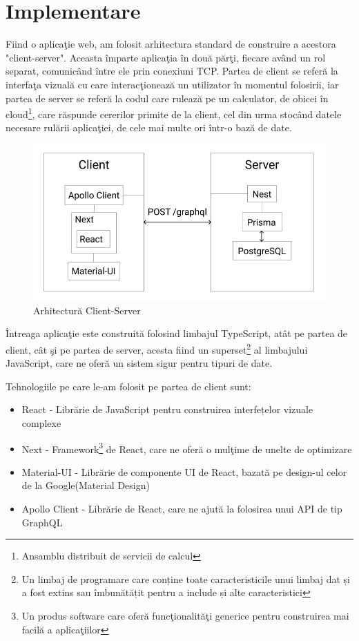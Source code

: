 \documentclass[12pt, a4paper, oneside, romanian]{teza-upb}
\begin{document}
\newpage
\hbox{}
\chapter{Implementare}

Fiind o aplicaţie web, am folosit arhitectura standard de construire a acestora "client-server". Aceasta împarte aplicaţia în două părţi, fiecare având un rol separat, comunicând între ele prin conexiuni TCP. Partea de client se referă la interfaţa vizuală cu care interacţionează un utilizator în momentul folosirii, iar partea de server se referă la codul care rulează pe un calculator, de obicei în cloud\footnote{Ansamblu distribuit de servicii de calcul}, care răspunde cererilor primite de la client, cel din urma stocând datele necesare rulării aplicaţiei, de cele mai multe ori într-o bază de date.\cite{arhitecturaclientserver}

\begin{figure}[H]
\centering
\includegraphics*[width=0.7\columnwidth]{arhitectura-client-server}
\caption{Arhitectură Client-Server}
\label{arhitectura-client-server}
\end{figure}

Întreaga aplicaţie este construită folosind limbajul TypeScript, atât pe partea de client, cât şi pe partea de server, acesta fiind un superset\footnote{Un limbaj de programare care conține toate caracteristicile unui limbaj dat și a fost extins sau îmbunătățit pentru a include și alte caracteristici} al limbajului JavaScript, care ne oferă un sistem sigur pentru tipuri de date.\cite{documentatietypescript}

Tehnologiile pe care le-am folosit pe partea de client sunt:
\begin{itemize}
	\item React\cite{documentatiereact} - Librărie de JavaScript pentru construirea interfețelor vizuale complexe
	\item Next\cite{documentatienext} - Framework\footnote{Un produs software care oferă funcţionalităţi generice pentru construirea mai facilă a aplicaţiilor} de React, care ne oferă o mulţime de unelte de optimizare
	\item Material-UI\cite{documentatiematerialui} - Librărie de componente UI de React, bazată pe design-ul celor de la Google(Material Design)
	\item Apollo Client\cite{documentatieapolloclient} - Librărie de React, care ne ajută la folosirea unui API de tip GraphQL
\end{itemize}
\end{document}
